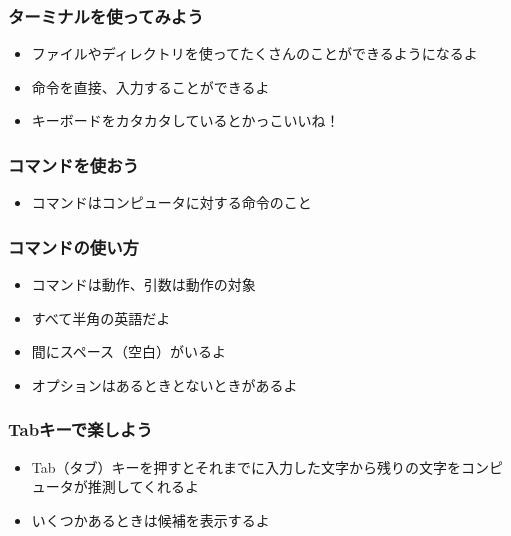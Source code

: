 \begin{frame}
    \frametitle{ターミナルを使ってみよう}
    \begin{itemize}
        \item ファイルやディレクトリを使ってたくさんのことができるようになるよ
        \item 命令を直接、入力することができるよ
        \item キーボードをカタカタしているとかっこいいね！
    \end{itemize}
\end{frame}

\begin{frame}
    \frametitle{コマンドを使おう}
    \begin{itemize}
        \item コマンドはコンピュータに対する命令のこと
    \end{itemize}
\end{frame}

\begin{frame}
    \frametitle{コマンドの使い方}
    \begin{itemize}
        \item コマンドは動作、引数は動作の対象
        \item すべて半角の英語だよ
        \item 間にスペース（空白）がいるよ
        \item オプションはあるときとないときがあるよ
    \end{itemize}
\end{frame}

\begin{frame}
    \frametitle{Tabキーで楽しよう}
    \begin{itemize}
        \item Tab（タブ）キーを押すとそれまでに入力した文字から残りの文字をコンピュータが推測してくれるよ
        \item いくつかあるときは候補を表示するよ
    \end{itemize}
\end{frame}

